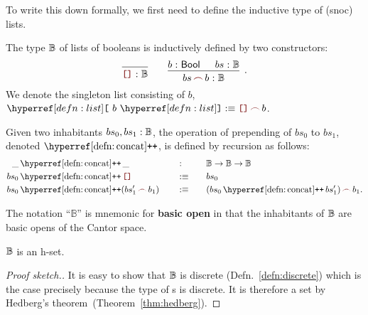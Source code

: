 To write this down formally, we first need to define the inductive type of (snoc) lists.

\begin{defn}\label{defn:list}
  The type $\mathbb{B}{}$ of lists of booleans is inductively defined by two constructors:
  \[
    \begin{prooftree}
      \infer0{\oftyI{\emptylist{}}{\bitlist{}}}
    \end{prooftree}
    \qquad
    \begin{prooftree}
      \hypo{\oftyI{b}{\bool{}}}
      \hypo{\oftyI{bs}{\bitlist{}}}
      \infer2[.]{\oftyI{\snoc{bs}{b}}{\bitlist{}}}
    \end{prooftree}
  \]
  We denote the singleton list consisting of $b$,
      $\singleton{b} \is \snoc{\emptylist}{b}$.
\end{defn}

\begin{defn}\label{defn:concat}
  Given two inhabitants $bs_0, bs_1:\mathbb{B}{}$, the operation of prepending of
  $bs_0$ to $bs_1$, denoted $\concat$, is defined by recursion as follows:
  \begin{alignat*}{3}
    \_&\concat\_                      \quad&&:\quad   && \bitlist{} \rightarrow \bitlist{} \rightarrow \bitlist{} \\
    bs_0 &\concat \emptylist          \quad&&\is\quad && bs_0                                 \\
    bs_0 &\concat (\snoc{bs_1'}{b_1}) \quad&&\is\quad && \snoc{(bs_0 \concat bs_1')}{b_1}     .
  \end{alignat*}
\end{defn}

The notation ``$\mathbb{B}$'' is mnemonic for \textbf{basic open} in that the inhabitants
of $\mathbb{B}{}$ are basic opens of the Cantor space.

\begin{prop}\label{prop:list-set}
  $\mathbb{B}{}$ is an h-set.
\end{prop}
\begin{proof}[Proof sketch.]
  It is easy to show that $\mathbb{B}{}$ is discrete (Defn.~\ref{defn:discrete}) which is
  the case precisely because the type of \verbool{}s is discrete. It is therefore a set by
  Hedberg's theorem~(Theorem~\ref{thm:hedberg}).
\end{proof}

